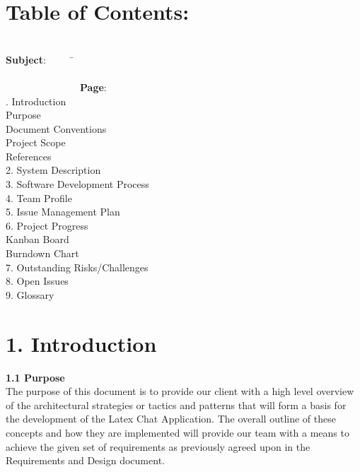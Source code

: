 \documentclass[29pt,a4paper]{moderncv}
\begin{document}
\newpage
\section{\textbf{Table of Contents:}}
\begin{tabbing}
\\\textbf{Subject}: ~~~~~\= ~~~~~~~~~~~~~~~~~~~~~~~~~~~~~~~~~~~~~~~~~~~~~~~~~~~~~~~~~~~~~~~~~~~~~~~~~~~~~~~~~~~~~~~\= \textbf{Page}:
\\. Introduction \> \\							
 Purpose 	\\							
 Document Conventions 					\\
 Project Scope 							\\
 References 							\\
2. System Description \> 					\\
3. Software Development Process \> 				\\
4. Team Profile\>  				\\
5. Issue Management Plan \>  	\\
6. Project Progress \>  	\\
 Kanban Board \> \\
 Burndown Chart \> \\
7. Outstanding Risks/Challenges \>  	\\
8. Open Issues \>  	\\
9. Glossary \>  	\\
\end{tabbing}

\newpage
	\section*{\textbf{1. Introduction}}
	\vspace{4mm}
	
		\textbf{1.1 Purpose}
			\\The purpose of this document is to provide our client with a high level overview of the architectural strategies or tactics and patterns that will form a basis for the development of the Latex Chat Application. The overall outline of these concepts and how they are implemented will provide our team with a means to achieve the given set of requirements as previously agreed upon in the Requirements and Design document.\\
		\vspace{1mm}
		
\end{document}
